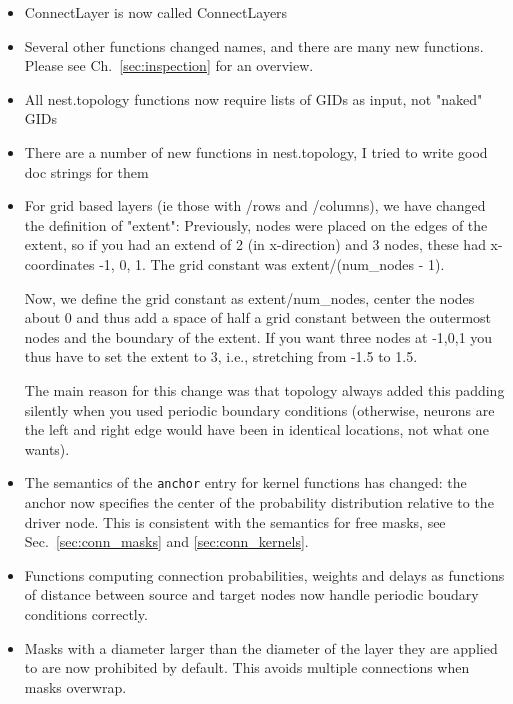\documentclass[a4paper,12pt]{report}
\begin{document}
\begin{itemize}
\item ConnectLayer is now called ConnectLayers
\item Several other functions changed names, and there are many new
  functions. Please see Ch.~\ref{sec:inspection} for an overview.
\item All nest.topology functions now require lists of GIDs as input,
  not "naked" GIDs
\item There are a number of new functions in nest.topology, I tried to
  write good doc strings for them
\item For grid based layers (ie those with /rows and /columns), we
  have changed the definition of "extent": Previously, nodes were
  placed on the edges of the extent, so if you had an extend of 2 (in
  x-direction) and 3 nodes, these had x-coordinates -1, 0, 1. The grid
  constant was extent/(num\_nodes - 1).

  Now, we define the grid constant as extent/num\_nodes, center the
  nodes about 0 and thus add a space of half a grid constant between
  the outermost nodes and the boundary of the extent. If you want
  three nodes at -1,0,1 you thus have to set the extent to 3, i.e.,
  stretching from -1.5 to 1.5.

  The main reason for this change was that topology always added this
  padding silently when you used periodic boundary conditions
  (otherwise, neurons are the left and right edge would have been in
  identical locations, not what one wants).
\item The semantics of the \lstinline!anchor! entry for kernel
  functions has changed: the anchor now specifies the center of the
  probability distribution relative to the driver node. This is
  consistent with the semantics for free masks, see
  Sec.~\ref{sec:conn_masks} and \ref{sec:conn_kernels}.
\item Functions computing connection probabilities, weights and delays
  as functions of distance between source and target nodes now handle
  periodic boudary conditions correctly.
\item Masks with a diameter larger than the diameter of the layer they
  are applied to are now prohibited by default. This avoids multiple
  connections when masks overwrap.
\end{itemize}




\listoffigures %
\listoftables  %

\printindex  
\end{document}

